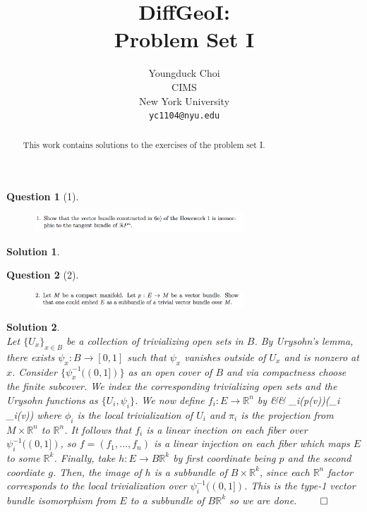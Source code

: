 \documentclass{article} %
\title{DiffGeoI: \\
Problem Set I}
\author{
Youngduck Choi \\
CIMS \\
New York University\\
\texttt{yc1104@nyu.edu} \\
}
\def\eQb#1\eQe{\begin{eqnarray*}#1\end{eqnarray*}}
\theoremstyle{quest}
\newtheorem*{question}{Question}
\newtheorem*{solution}{Solution}
\begin{document}
\maketitle

\begin{abstract}
This work contains solutions to the exercises of the problem set I.
\end{abstract}

\bigskip

\begin{question}[1]
\hfill
\begin{figure}[h!]
  \centering
    \includegraphics[width=0.7\textwidth]{DG-e3-p1.png}
\end{figure}
\end{question}
\begin{solution} \hfill \\

\end{solution}

\newpage

\begin{question}[2]
\hfill
\begin{figure}[h!]
  \centering
    \includegraphics[width=0.7\textwidth]{DG-e3-p2.png}
\end{figure}
\end{question}
\begin{solution} \hfill \\
Let $\{U_x\}_{x \in B}$ be a collection of trivializing open sets in $B$. By 
Urysohn's lemma, there exists $\psi_x:B \to [0,1]$ such that $\psi_x$ vanishes
outside of $U_x$ and is nonzero at $x$. Consider $\{\psi_x^{-1}((0,1])\}$ 
as an open cover of $B$ and via compactness choose the finite subcover. We index
the corresponding trivializing open sets and the Urysohn functions as $\{ 
U_i, \psi_i\}$. We now define $f_i:E \to \mathbb{R}^n$ by 
\eQb
v &\mapsto& \psi_i(p(v))(\pi_i \phi_i(v))
\eQe 
where $\phi_i$ is the local trivialization of $U_i$ and $\pi_i$ is the 
projection from $M \times \mathbb{R}^n$ to $\mathbb{R}^n$. It follows that
$f_i$ is a linear inection on each fiber over $\psi_i^{-1}((0,1])$, so 
$f = (f_1,...,f_n)$ is a linear injection on each fiber which maps $E$ to 
some $\mathbb{R}^{k}$. Finally, take $h:E \to B \mathbb{R}^k$ by
first coordinate being $p$ and the second coordiate $g$. Then, the image of 
$h$ is a subbundle of $B \times \mathbb{R}^k$, since each $\mathbb{R}^n$ factor 
corresponds to the local trivialization over $\psi_i^{-1}((0,1])$.
This is the type-1 vector bundle isomorphism from $E$ to a subbundle of $B \mathbb{R}^k$
so we are done. \hfill $\qed$


\end{solution}
\end{document}
